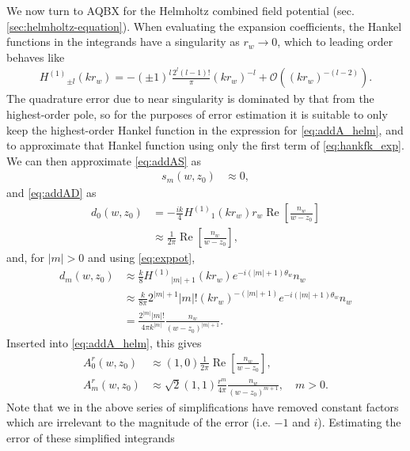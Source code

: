 \documentclass[hidelinks]{siamart1116}
\begin{document}
We now turn to AQBX for the Helmholtz combined field potential
(sec. \ref{sec:helmholtz-equation}). When evaluating the expansion
coefficients, the Hankel functions in the integrands have a
singularity as $r_w \to 0$, which to leading order behaves like
\cite[\S10.4,\S10.8]{NIST:DLMF}
\begin{align}
  {H^{(1)}}_{\pm l}(kr_w) = -(\pm 1)^l \frac{2^l(l-1)!}{\pi}(kr_w)^{-l} 
  + {\mathcal{O}}\left((kr_w)^{-(l-2)}\right).
  \label{eq:hankfk_exp}
\end{align}
The quadrature error due to near singularity is dominated by that from
the highest-order pole, so for the purposes of error estimation it is
suitable to only keep the highest-order Hankel function in the
expression for \eqref{eq:addA_helm}, and to approximate that Hankel
function using only the first term of \eqref{eq:hankfk_exp}. We can
then approximate \eqref{eq:addAS} as
\begin{align}
  {s}_m(w, z_0) &\approx 0,
\end{align}
and \eqref{eq:addAD} as
\begin{align}
  {d}_0(w, z_0) &= -\frac{ik}{4} {H^{(1)}}_1(kr_w) r_w {\operatorname{Re}} \left[ \frac{n_w}{w-z_0} \right]
  \\
                   &\approx 
                     \frac{1}{2\pi} {\operatorname{Re}} \left[ \frac{n_w}{w-z_0}\right],
\end{align}
and, for $|m|>0$ and using \eqref{eq:exppot},
\begin{align}
  {d}_m(w, z_0) &\approx \frac{k}{8}{H^{(1)}}_{|m|+1}(kr_w) e^{-i(|m|+1)\theta_w}n_w \\
                   &\approx \frac{k}{8\pi} 2^{|m|+1}|m|! (kr_w)^{-(|m|+1)} e^{-i(|m|+1)\theta_w}n_w \\
                   &= \frac{2^{|m|}|m|!}{4\pi k^{|m|}} \frac{n_w}{(w-z_0)^{|m|+1}}.
\end{align}
Inserted into \eqref{eq:addA_helm}, this gives
\begin{align}
  {A}_0^r(w, z_0) &\approx  (1, 0) \frac{1}{2\pi} 
                      {\operatorname{Re}} \left[ \frac{n_w}{w-z_0}\right],\\
  {A}_m^r(w, z_0) &\approx 
                      \sqrt{2} \left(1, 1 \right) \frac{r^{m}}{4\pi}
                      \frac{n_w}{(w-z_0)^{m+1}}, \quad m>0 .
\end{align}
Note that we in the above series of simplifications have removed
constant factors which are irrelevant to the magnitude of the error
(i.e. $-1$ and $i$). Estimating the error of these simplified integrands
\end{document}
